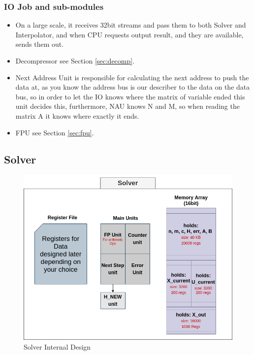 \documentclass[12pt]{report}
\begin{document}
\subsubsection{IO Job and sub-modules}

\begin{itemize}
    \item On a large scale, it receives 32bit streams and pass them to both {Solver} and {Interpolator}, and when {CPU} requests output result, and they are available, sends them out.
    \item {Decompressor} see Section \ref{sec:decomp}.
    \item {Next Address Unit} is responsible for calculating the next address to push the data at, as you know the address bus is our describer to the data on the data bus, so in order to let the IO knows where the matrix of variable ended this unit decides this, furthermore, {NAU} knows {N} and {M}, so when reading the matrix {A} it knows where exactly it ends.
    \item {FPU} see Section \ref{sec:fpu}.
\end{itemize}

\subsection{Solver}

\begin{figure}[hp]
    \centering
    \includegraphics[width=\textwidth]{solver}
    \caption{Solver Internal Design}
    \label{fig:solver}
\end{figure}
\end{document}
